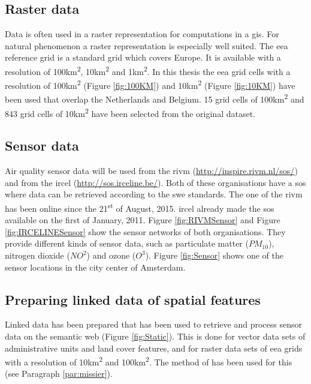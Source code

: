 \subsection{Raster data}
Data is often used in a raster representation for computations in a \ac{gis}. For natural phenomenon a raster representation is especially well suited. The \ac{eea} reference grid is a standard grid which covers Europe. It is available with a resolution of 100km\textsuperscript{2}, 10km\textsuperscript{2} and 1km\textsuperscript{2}. In this thesis the \ac{eea} grid cells with a resolution of 100km\textsuperscript{2} (Figure \ref{fig:100KM}) and 10km\textsuperscript{2} (Figure \ref{fig:10KM}) have been used that overlap the Netherlands and Belgium. 15 grid cells of 100km\textsuperscript{2} and 843 grid cells of 10km\textsuperscript{2} have been selected from the original dataset.  

\subsection{Sensor data}
Air quality sensor data will be used from the \ac{rivm} (\url{http://inspire.rivm.nl/sos/}) and from the \ac{ircel} (\url{http://sos.irceline.be/}). Both of these organisations have a \ac{sos} where data can be retrieved according to the \ac{swe} standards. The one of the \ac{rivm} has been online since the 21\textsuperscript{st} of August, 2015. \ac{ircel} already made the \ac{sos} available on the first of January, 2011. Figure \ref{fig:RIVMSensor} and Figure \ref{fig:IRCELINESensor} show the sensor networks of both organisations. They provide different kinds of sensor data, such as particulate matter ($PM_{10}$), nitrogen dioxide ($NO^{2}$) and ozone ($O^{3}$). Figure \ref{fig:Sensor} shows one of the sensor locations in the city center of Amsterdam. 

\subsection{Preparing linked data of spatial features}
Linked data has been prepared that has been used to retrieve and process sensor data on the semantic web (Figure \ref{fig:Static}). This is done for vector data sets of administrative units and land cover features, and for raster data sets of \ac{eea} grids with a resolution of 10km\textsuperscript{2} and 100km\textsuperscript{2}. The method of \cite{LD:Missier} has been used for this (see Paragraph \ref{par:missier}).

